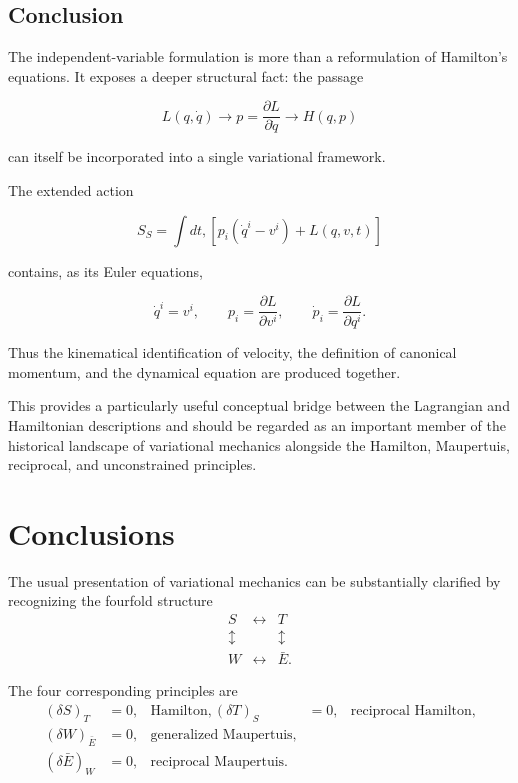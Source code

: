 \subsection{Conclusion}

The independent-variable formulation is more than a reformulation of Hamilton's equations. It exposes a deeper structural fact: the passage

$$
L(q,\dot q)
\longrightarrow
p=\frac{\partial L}{\partial\dot q}
\longrightarrow
H(q,p)
$$

can itself be incorporated into a single variational framework.

The extended action

\begin{equation}
\boxed{
S_S=
\int dt,
\left[
p_i(\dot q^i-v^i)+L(q,v,t)
\right]
}
\end{equation}

contains, as its Euler equations,

\begin{equation}
\boxed{
\dot q^i=v^i,\qquad
p_i=\frac{\partial L}{\partial v^i},\qquad
\dot p_i=\frac{\partial L}{\partial q^i}.
}
\end{equation}

Thus the kinematical identification of velocity, the definition of canonical momentum, and the dynamical equation are produced together.

This provides a particularly useful conceptual bridge between the Lagrangian and Hamiltonian descriptions and should be regarded as an important member of the historical landscape of variational mechanics alongside the Hamilton, Maupertuis, reciprocal, and unconstrained principles.

\section{Conclusions}

The usual presentation of variational mechanics can be substantially clarified by recognizing the fourfold structure
\begin{equation}
\boxed{
\begin{array}{ccc}
S &\longleftrightarrow&T\\
\updownarrow&&\updownarrow\\
W&\longleftrightarrow&\bar E.
\end{array}}
\end{equation}

The four corresponding principles are
\begin{equation}
\boxed{
\begin{aligned}
(\delta S)_T&=0,
&
\text{Hamilton},
(\delta T)_S&=0,
&
\text{reciprocal Hamilton},
\\
(\delta W)_{\bar E}&=0,
&
\text{generalized Maupertuis},
\\
(\delta\bar E)_W&=0,
&
\text{reciprocal Maupertuis}.
\end{aligned}}
\end{equation}

